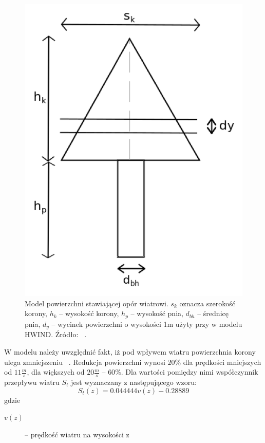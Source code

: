 \begin{figure}[!h]
	\center
	\includegraphics[scale=0.35]{HWIND2}
	\caption{Model powierzchni stawiającej opór wiatrowi. $s_k$ oznacza szerokość korony, $h_k$ -- wysokość korony, $h_p$ -- wysokość pnia, $d_{bh}$ -- średnicę pnia, $d_y$ -- wycinek powierzchni o wysokości 1m użyty przy w modelu HWIND. Źródło: ~\cite{chm_mgza}.}
	\label{fig:HWIND2}
\end{figure} 

W modelu należy uwzględnić fakt, iż pod wpływem wiatru powierzchnia korony ulega zmniejszeniu ~\cite{todo_jakies_zrodlo}. Redukcja powierzchni wynosi $20\%$ dla prędkości mniejszych od $11 \frac{m}{s}$, dla 
większych od $20\frac{m}{s}$ -- $60\%$. Dla wartości pomiędzy nimi współczynnik przepływu wiatru $S_t$ jest wyznaczany z następującego wzoru:
\begin{equation}
\label{eq:windFlow}
 S_t(z) = 0.044444v(z) - 0.28889
\end{equation}
gdzie
\begin{description}
  \item[$v(z)$] -- prędkość wiatru na wysokości z
\end{description}

